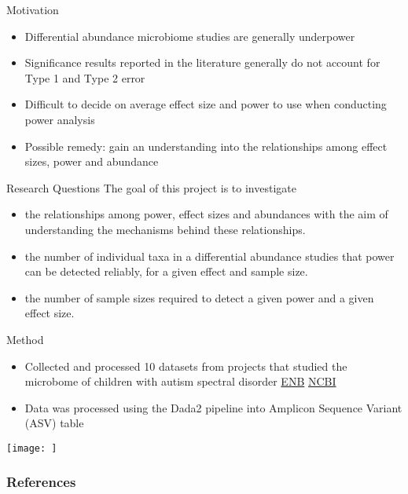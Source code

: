 \documentclass[11pt]{beamer}
\begin{document}

\begin{frame}
\tableofcontents
\end{frame}

\begin{frame}{Motivation}
\begin{itemize}[<+->]
\item Differential abundance microbiome studies are generally underpower \cite{kers2021power} %
\item Significance results reported  in the literature generally do not account for Type 1 and Type 2 error 
\item Difficult to decide on average effect size and power to use when conducting power analysis
\item Possible remedy: gain an understanding into the relationships among effect sizes, power and abundance 
    \end{itemize}
\end{frame}

\begin{frame}{Research Questions}
The goal of this project is to investigate
\begin{itemize}[<+->]
\item  the relationships among power, effect sizes and abundances with the aim of understanding the mechanisms behind these relationships.
\item the number of individual taxa in a differential abundance
studies that power can be detected reliably, for a given effect and sample size.
\item the number of sample sizes required to detect a given power and a given effect size. 
    \end{itemize}

\end{frame}

\begin{frame}{Method} 
\begin{itemize}[<+->]
\item Collected and processed 10 datasets from projects that studied the microbome of children with autism spectral disorder
\href{https://www.ebi.ac.uk/ena/browser/view}{ENB}
 \href{https://www.ncbi.nlm.nih.gov/}{NCBI}
 \item  Data was processed using the Dada2 pipeline into Amplicon Sequence Variant (ASV) table
\end{itemize}
\end{frame}


\begin{frame}
\texttt{[image: ]}

\end{frame}


























\begin{frame}[allowframebreaks]
        \frametitle{References}
        
        
\end{frame}
\end{document}
